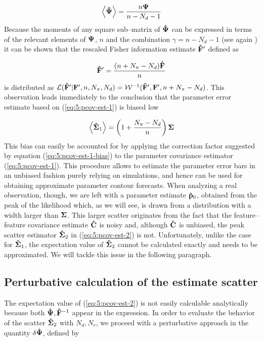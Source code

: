 \begin{equation}
\label{eq:5:inv-bias}
\left\langle\mathbf{\hat{\Psi}}\right\rangle = \frac{n\mathbf{\Psi}}{n-N_d-1}
\end{equation} 
%
Because the moments of any square sub--matrix of $\mathbf{\hat{\Psi}}$ can be expressed in terms of the relevant elements of $\mathbf{\Psi}$, $n$ and the combination $\gamma=n-N_d-1$ (see again \citep{MasumotoWishart}) it can be shown that the rescaled Fisher information estimate $\mathbf{\hat{F}}'$ defined as 

\begin{equation}
\label{eq:5:rescaledF}
\mathbf{\hat{F}}' = \frac{(n+N_\pi-N_d)\mathbf{\hat{F}}}{n}
\end{equation}
%
is distributed as $\mathcal{L}(\mathbf{\hat{F}}'\vert\mathbf{F}',n,N_\pi,N_d) = \mathcal{W}^{-1}(\mathbf{\hat{F}}',\mathbf{F}',n+N_\pi-N_d)$. This observation leads immediately to the conclusion that the parameter error estimate based on (\ref{eq:5:pcov-est-1}) is biased low

\begin{equation}
\label{eq:5:pcov-est-1-bias}
\left\langle\mathbf{\hat{\Sigma}}_1\right\rangle = \left(1+\frac{N_\pi-N_d}{n}\right)\mathbf{\Sigma}
\end{equation}
%
This bias can easily be accounted for by applying the correction factor suggested by equation (\ref{eq:5:pcov-est-1-bias}) to the parameter covariance estimator (\ref{eq:5:pcov-est-1}). This procedure allows to estimate the parameter error bars in an unbiased fashion purely relying on simulations, and hence can be used for obtaining approximate parameter contour forecasts. When analyzing a real observation, though, we are left with a parameter estimate $\mathbf{\hat{p}}_0$, obtained from the peak of the likelihood which, as we will see, is drawn from a distribution with a width larger than $\mathbf{\Sigma}$. This larger scatter originates from the fact that the feature--feature covariance estimate $\mathbf{\hat{C}}$ is noisy and, although $\mathbf{\hat{C}}$ is unbiased, the peak scatter estimator $\mathbf{\hat{\Sigma}}_2$ in (\ref{eq:5:pcov-est-2}) is not. Unfortunately, unlike the case for $\mathbf{\hat{\Sigma}}_1$, the expectation value of $\mathbf{\hat{\Sigma}}_2$ cannot be calculated exactly and needs to be approximated. We will tackle this issue in the following paragraph.  

\subsection{Perturbative calculation of the estimate scatter}
The expectation value of (\ref{eq:5:pcov-est-2}) is not easily calculable analytically because both $\mathbf{\hat{\Psi}},\mathbf{\hat{F}}^{-1}$ appear in the expression. In order to evaluate the behavior of the scatter $\mathbf{\hat{\Sigma}}_2$ with $N_d,N_r$, we proceed with a perturbative approach in the quantity $\delta\mathbf{\hat{\Psi}}$, defined by

